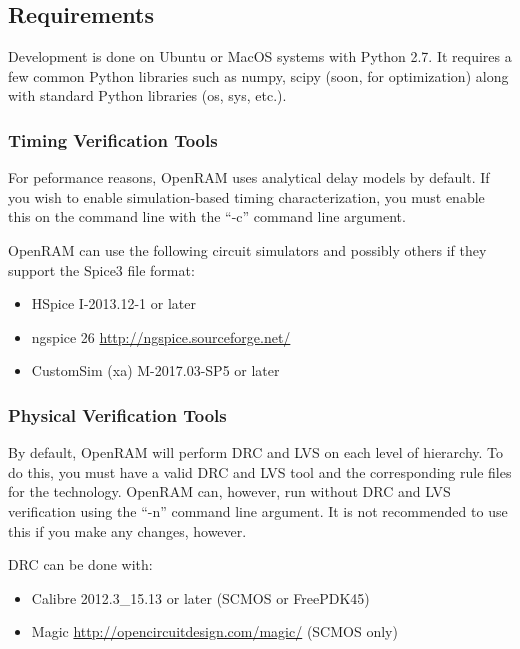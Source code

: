 \subsection{Requirements}

Development is done on Ubuntu or MacOS systems with Python 2.7. It
requires a few common Python libraries such as numpy, scipy (soon, for
optimization) along with standard Python libraries (os, sys, etc.).


\subsubsection{Timing Verification Tools}

For peformance reasons, OpenRAM uses analytical delay models by
default. If you wish to enable simulation-based timing
characterization, you must enable this on the command line with the
``-c'' command line argument.


OpenRAM can use the following circuit simulators and possibly others
if they support the Spice3 file format:
\begin{itemize}
  \item HSpice I-2013.12-1 or later
  \item ngspice 26 \url{http://ngspice.sourceforge.net/}
  \item CustomSim (xa) M-2017.03-SP5 or later
\end{itemize}

\subsubsection{Physical Verification Tools}

By default, OpenRAM will perform DRC and LVS on each level of
hierarchy.  To do this, you must have a valid DRC and LVS tool and the
corresponding rule files for the technology.  OpenRAM can, however,
run without DRC and LVS verification using the ``-n'' command line
argument. It is not recommended to use this if you make any changes,
however.

DRC can be done with:
\begin{itemize}
\item Calibre 2012.3\_15.13 or later (SCMOS or FreePDK45)
\item Magic \url{http://opencircuitdesign.com/magic/} (SCMOS only)
\end{itemize}

